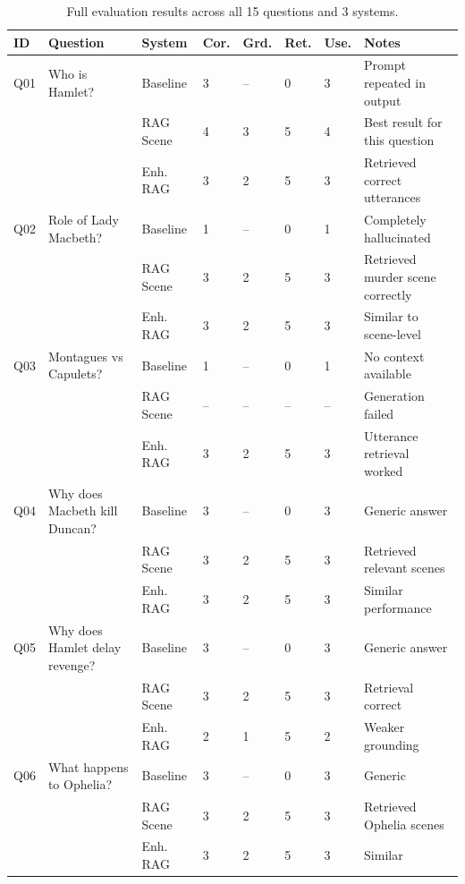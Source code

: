 \documentclass[10pt,conference]{IEEEtran}
\begin{document}
\begin{table}[p]
\centering
\caption{Full evaluation results across all 15 questions and 3 systems.}
\label{tab:full-eval}
\begin{tabularx}{\textwidth}{p{0.6cm} p{4cm} p{2.2cm} p{1cm} p{1cm} p{1cm} p{1cm} X}
\toprule
ID & Question & System & Cor. & Grd. & Ret. & Use. & Notes \\
\midrule
Q01 & Who is Hamlet? & Baseline & 3 & -- & 0 & 3 & Prompt repeated in output \\
    &                & RAG Scene & 4 & 3 & 5 & 4 & Best result for this question \\
    &                & Enh. RAG  & 3 & 2 & 5 & 3 & Retrieved correct utterances \\
\midrule
Q02 & Role of Lady Macbeth? & Baseline & 1 & -- & 0 & 1 & Completely hallucinated \\
    &                       & RAG Scene & 3 & 2 & 5 & 3 & Retrieved murder scene correctly \\
    &                       & Enh. RAG  & 3 & 2 & 5 & 3 & Similar to scene-level \\
\midrule
Q03 & Montagues vs Capulets? & Baseline & 1 & -- & 0 & 1 & No context available \\
    &                        & RAG Scene & -- & -- & -- & -- & Generation failed \\
    &                        & Enh. RAG  & 3 & 2 & 5 & 3 & Utterance retrieval worked \\
\midrule
Q04 & Why does Macbeth kill Duncan? & Baseline & 3 & -- & 0 & 3 & Generic answer \\
    &                               & RAG Scene & 3 & 2 & 5 & 3 & Retrieved relevant scenes \\
    &                               & Enh. RAG  & 3 & 2 & 5 & 3 & Similar performance \\
\midrule
Q05 & Why does Hamlet delay revenge? & Baseline & 3 & -- & 0 & 3 & Generic answer \\
    &                                & RAG Scene & 3 & 2 & 5 & 3 & Retrieval correct \\
    &                                & Enh. RAG  & 2 & 1 & 5 & 2 & Weaker grounding \\
\midrule
Q06 & What happens to Ophelia? & Baseline & 3 & -- & 0 & 3 & Generic \\
    &                          & RAG Scene & 3 & 2 & 5 & 3 & Retrieved Ophelia scenes \\
    &                          & Enh. RAG  & 3 & 2 & 5 & 3 & Similar \\

\end{tabularx}
\end{table}
\end{document}
